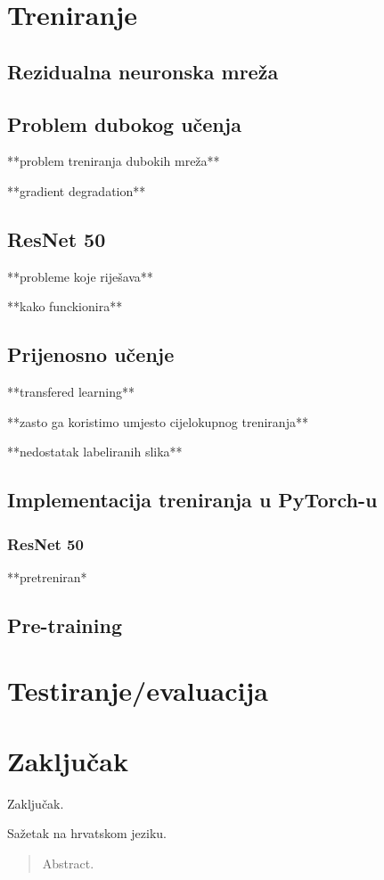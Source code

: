 \documentclass[times, utf8, zavrsni,numeric]{fer}
\begin{document}
\chapter{Treniranje}
\section{Rezidualna neuronska mreža}
\section{Problem dubokog učenja}
**problem treniranja dubokih mreža**	

**gradient degradation**
\section{ResNet 50}
**probleme koje riješava**

**kako funckionira**

\section{Prijenosno učenje}
**transfered learning**

**zasto ga koristimo umjesto cijelokupnog treniranja**

**nedostatak labeliranih slika**

\section{Implementacija treniranja u PyTorch-u}
\subsection{ResNet 50}
**pretreniran*

\section{Pre-training}
\chapter{Testiranje/evaluacija}

\chapter{Zaključak}
Zaključak.




\begin{sazetak}
Sažetak na hrvatskom jeziku.

\end{sazetak}



\begin{abstract}
Abstract.

\end{abstract}
\end{document}

